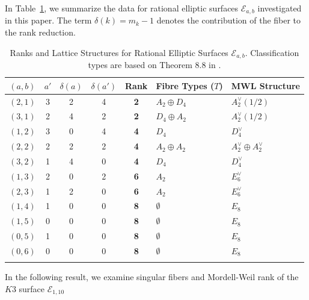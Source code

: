 \documentclass[11pt]{amsart}
\newcommand{\Ee}{{\mathcal E}}
\numberwithin{equation}{section}
\numberwithin{table}{section}
\newcommand\<{\langle}
\begin{document}
In  Table~\ref{Tab1}, we summarize the data for  rational elliptic surfaces $\Ee_{a,b}$ investigated in this paper. The term $\delta(k) = m_k - 1$ denotes the contribution of the fiber to the rank reduction.

\begin{table}[htbp]
	\centering
	\small
	\begin{tabular}{@{}cccccll@{}}
		\toprule
		$(a,b)$ & $a'$ & $\delta(a)$ & $\delta(a')$ & Rank & Fibre Types ($T$) & MWL Structure \\ \midrule
		$(2,1)$ & 3 & 2 & 4 & \textbf{2} & $A_2 \oplus D_4$ & $A_2^\vee(1/2)$ \\
		$(3,1)$ & 2 & 4 & 2 & \textbf{2} & $D_4 \oplus A_2$ & $A_2^\vee(1/2)$ \\
		$(1,2)$ & 3 & 0 & 4 & \textbf{4} & $D_4$ & $D_4^\vee$ \\
		$(2,2)$ & 2 & 2 & 2 & \textbf{4} & $A_2 \oplus A_2$ & $A_2^\vee \oplus A_2^\vee$ \\
		$(3,2)$ & 1 & 4 & 0 & \textbf{4} & $D_4$ & $D_4^\vee$ \\
		$(1,3)$ & 2 & 0 & 2 & \textbf{6} & $A_2$ & $E_6^\vee$ \\
		$(2,3)$ & 1 & 2 & 0 & \textbf{6} & $A_2$ & $E_6^\vee$ \\
		$(1,4)$ & 1 & 0 & 0 & \textbf{8} & $\emptyset$ & $E_8$ \\
		$(1,5)$ & 0 & 0 & 0 & \textbf{8} & $\emptyset$ & $E_8$ \\
		$(0,5)$ & 1 & 0 & 0 & \textbf{8} & $\emptyset$ & $E_8$ \\
		$(0,6)$ & 0 & 0 & 0 & \textbf{8} & $\emptyset$ & $E_8$ \\ \bottomrule
		\vspace{3pt}
	\end{tabular}
	\caption{Ranks and Lattice Structures for Rational Elliptic Surfaces $\Ee_{a,b}$. 
		Classification types are based on Theorem 8.8 in \cite{Schuett2019}.}
			\label{Tab1}
\end{table}

In the following result, we examine singular fibers and Mordell-Weil rank of the $K3$ surface $\Ee_{1,10}$
\end{document}
